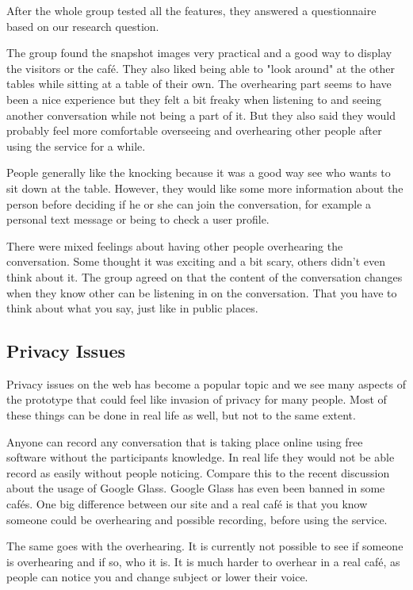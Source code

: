 \documentclass[12pt, titlepage]{article}
\begin{document}
After the whole group tested all the features, they answered a questionnaire based on our research question.

The group found the snapshot images very practical and a good way to display the visitors or the café. They also liked being able to "look around" at the other tables while sitting at a table of their own. The overhearing part seems to have been a nice experience but they felt a bit freaky when listening to and seeing another conversation while not being a part of it. But they also said they would probably feel more comfortable overseeing and overhearing other people after using the service for a while.

People generally like the knocking because it was a good way see who wants to sit down at the table. However, they would like some more information about the person before deciding if he or she can join the conversation, for example a personal text message or being to check a user profile.

There were mixed feelings about having other people overhearing the conversation. Some thought it was exciting and a bit scary, others didn't even think about it. The group agreed on that the content of the conversation changes when they know other can be listening in on the conversation. That you have to think about what you say, just like in public places.

\subsection{Privacy Issues}
Privacy issues on the web has become a popular topic and we see many aspects of the prototype that could  feel like invasion of privacy for many people. Most of these things can be done in real life as well, but not to the same extent. 

Anyone can record any conversation that is taking place online using free software without the participants knowledge. In real life they would not be able record as easily without people noticing. Compare this to the recent discussion about the usage of Google Glass. Google Glass has even been banned in some cafés\cite{40}.
One big difference between our site and a real café is that you know someone could be overhearing and possible recording, before using the service.

The same goes with the overhearing. It is currently not possible to see if someone is overhearing and if so, who it is. It is much harder to overhear in a real café, as people can notice you and change subject or lower their voice.
\end{document}
